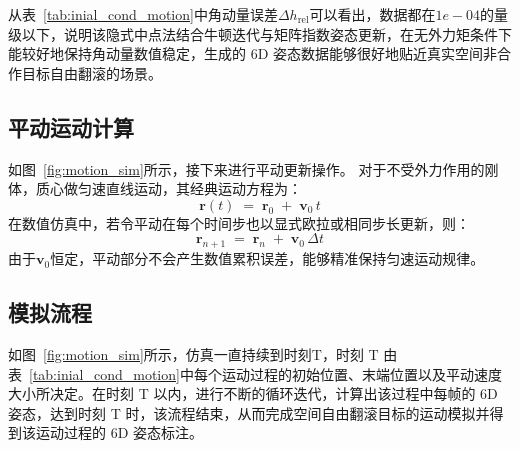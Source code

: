 从表~\ref{tab:inial_cond_motion}中角动量误差$\Delta h_{\mathrm{rel}}$可以看出，数据都在$1e-04$的量级以下，说明该隐式中点法结合牛顿迭代与矩阵指数姿态更新，在无外力矩条件下能较好地保持角动量数值稳定，生成的 6D 姿态数据能够很好地贴近真实空间非合作目标自由翻滚的场景。


\subsection{平动运动计算}

如图~\ref{fig:motion_sim}所示，接下来进行平动更新操作。
对于不受外力作用的刚体，质心做匀速直线运动，其经典运动方程为：
\begin{equation}\label{eq:translation}
	\mathbf{r}(t) \;=\;
	\mathbf{r}_{0}
	\;+\;
	\mathbf{v}_{0}\,t
\end{equation}
在数值仿真中，若令平动在每个时间步也以显式欧拉或相同步长更新，则：
\begin{equation}
	\mathbf{r}_{n+1} 
	\;=\;
	\mathbf{r}_{n} 
	\;+\;
	\mathbf{v}_{0}\,\Delta t
\end{equation}
由于$\mathbf{v}_0$恒定，平动部分不会产生数值累积误差，能够精准保持匀速运动规律。

\subsection{模拟流程}
如图~\ref{fig:motion_sim}所示，仿真一直持续到时刻T，时刻 T 由表~\ref{tab:inial_cond_motion}中每个运动过程的初始位置、末端位置以及平动速度大小所决定。在时刻 T 以内，进行不断的循环迭代，计算出该过程中每帧的 6D 姿态，达到时刻 T 时，该流程结束，从而完成空间自由翻滚目标的运动模拟并得到该运动过程的 6D 姿态标注。

